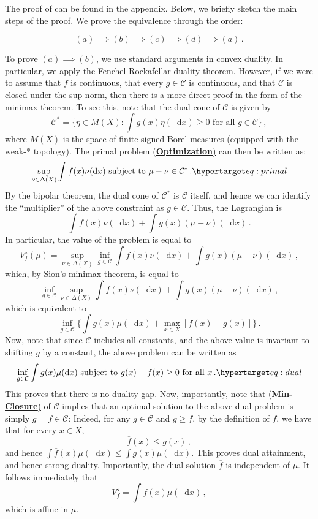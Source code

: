 \documentclass[12pt,letterpaper]{article}
\newenvironment{original}{\color{black}}{}
\theoremstyle{plain}
\theoremstyle{definition}
\theoremstyle{remark}
\newcommand{\C}{\mathcal{C}}
\renewcommand*\d{\mathop{}\!\mathrm{d}}
\theoremstyle{definition}
\DeclareRobustCommand{\weqref}[2]{
  \leavevmode\nobreak\hbox{\hyperlink{#2}{\textup{(#1)}}}
}
\begin{document}
\begin{original}
The proof of  can be found in the appendix. Below, we briefly sketch the main steps of the proof.  We prove the equivalence through the order:

\[(a) \implies (b) \implies (c) \implies (d) \implies (a) \,.\]

To prove $(a) \implies (b)$, we use standard arguments in convex duality. In particular, we apply the Fenchel-Rockafellar duality theorem. However, if we were to assume that $f$ is continuous, that every $g \in \C$ is continuous, and that $\C$ is closed under the sup norm, then there is a more direct proof in the form of the minimax theorem. To see this, note that the dual cone of $\C$ is given by
\[\C^* = \Big\{\eta \in M(X): \int g(x) \eta(\d x) \geq 0 \text{ for all $g \in \C$} \Big\}\,,\]
where $M(X)$ is the space of finite signed Borel measures (equipped with the weak-* topology). The primal problem \weqref{\textbf{Optimization}}{eq:stochastic-optimization} can then be written as:
\[\sup_{\nu \in \Delta(X)} \int f(x) \nu (\d x) \text{ subject to }  \mu - \nu \in \C^*\,. \eqtag[-2.5em][0.8\baselineskip]{\textbf{Primal}}{eq:primal}\]
By the bipolar theorem, the dual cone of $\C^*$ is $\C$ itself, and hence we can identify the ``multiplier'' of the above constraint as $g \in \C$. Thus, the Lagrangian is
\[\int f(x) \nu(\d x) + \int g(x) (\mu - \nu)(\d x)\,.\]
In particular, the value of the problem is equal to
\[V^\star_f(\mu)=\sup_{\nu \in \Delta(X)} \inf_{g \in \C} \int f(x) \nu(\d x) + \int g(x) (\mu - \nu)(\d x)\,,\]
which, by Sion's minimax theorem, is equal to
\[\inf_{g \in \C} \sup_{\nu \in \Delta(X)} \int f(x) \nu(\d x) + \int g(x) (\mu - \nu)(\d x)\,,\]
which is equivalent to
\[\inf_{g \in \C} \Big\{\int g(x) \mu(\d x) +   \max_{x \in X} [f(x) - g(x)]\Big\}\,.\]
Now, note that since $\C$ includes all constants, and the above value is invariant to shifting $g$ by a constant, the above problem can be written as
\[\inf_{g \in \C} \int g(x) \mu(\d x) \text{ subject to } g(x)- f(x) \geq 0 \text{ for all $x$}\,. \eqtag[-2.5em][0.8\baselineskip]{\textbf{Dual}}{eq:dual}\]
This proves that there is no duality gap. Now, importantly, note that \weqref{\textbf{Min-Closure}}{eq:min-closure} of $\C$ implies that an optimal solution to the above dual problem is simply $g = \overline{f} \in \C$: Indeed, for any $g \in \C$ and $g \geq f$, by the definition of $\overline{f}$, we have that for every $x \in X$,
\[\overline{f}(x) \leq g(x)\,,\]
and hence $\int \overline{f}(x) \mu(\d x) \leq \int g(x) \mu(\d x)$. This proves dual attainment, and hence strong duality. Importantly, the dual solution $\overline{f}$ is independent of $\mu$. It follows immediately that
\[V^\star_f = \int \overline{f}(x) \mu(\d x)\,,\]
which is affine in $\mu$.


\end{original}
\end{document}
